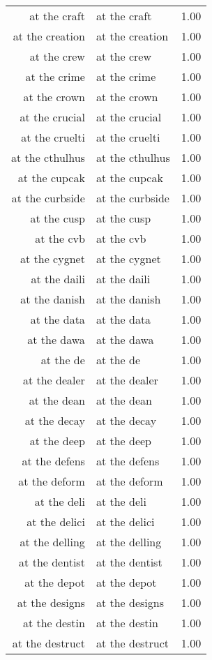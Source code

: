 \begin{table}[ht]
\begin{tabular}{rlr}
  at the craft & at the craft & 1.00 \\ 
  at the creation & at the creation & 1.00 \\ 
  at the crew & at the crew & 1.00 \\ 
  at the crime & at the crime & 1.00 \\ 
  at the crown & at the crown & 1.00 \\ 
  at the crucial & at the crucial & 1.00 \\ 
  at the cruelti & at the cruelti & 1.00 \\ 
  at the cthulhus & at the cthulhus & 1.00 \\ 
  at the cupcak & at the cupcak & 1.00 \\ 
  at the curbside & at the curbside & 1.00 \\ 
  at the cusp & at the cusp & 1.00 \\ 
  at the cvb & at the cvb & 1.00 \\ 
  at the cygnet & at the cygnet & 1.00 \\ 
  at the daili & at the daili & 1.00 \\ 
  at the danish & at the danish & 1.00 \\ 
  at the data & at the data & 1.00 \\ 
  at the dawa & at the dawa & 1.00 \\ 
  at the de & at the de & 1.00 \\ 
  at the dealer & at the dealer & 1.00 \\ 
  at the dean & at the dean & 1.00 \\ 
  at the decay & at the decay & 1.00 \\ 
  at the deep & at the deep & 1.00 \\ 
  at the defens & at the defens & 1.00 \\ 
  at the deform & at the deform & 1.00 \\ 
  at the deli & at the deli & 1.00 \\ 
  at the delici & at the delici & 1.00 \\ 
  at the delling & at the delling & 1.00 \\ 
  at the dentist & at the dentist & 1.00 \\ 
  at the depot & at the depot & 1.00 \\ 
  at the designs & at the designs & 1.00 \\ 
  at the destin & at the destin & 1.00 \\ 
  at the destruct & at the destruct & 1.00 \\ 

\end{tabular}
\end{table}
